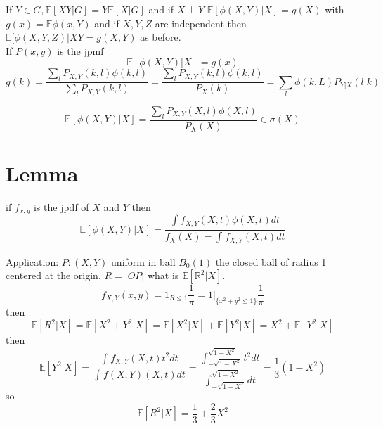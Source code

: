 \documentclass[11pt]{article}
\begin{document}
If $Y \in G, \mathbb{E}[XY | G] = Y \mathbb{E}[X | G]$ and
if $X \perp Y$  $ \mathbb{E}[\phi(X,Y) | X] = g(X)$  with $g(x) = \mathbb{E} \phi(x,Y)$ and if
$X,Y,Z$ are independent then  $ \mathbb{E}[\phi(X,Y,Z) | XY = g(X,Y)$ as before.\\
If $P(x,y)$ is the jpmf
 \[
     \mathbb{E}[\phi(X,Y) | X] = g(x)
\] 
\[
g(k) = \frac{\sum_{l}^{}P_{X,Y}(k,l)\phi(k,l)}{\sum_{l}^{}P_{X,Y}(k,l)} = \frac{\sum_{l}^{} P_{X,Y}(k,l)\phi(k,l)}{P_X(k)} = \sum_{l}^{}\phi(k,L) P_{Y|X}(l | k)
\] 

\[
    \mathbb{E}[\phi(X,Y) | X] = \frac{\sum_{l}^{}P_{X,Y}(X,l)\phi(X,l)}{P_X(X)} \in \sigma(X)
\] 

\section{Lemma}
if $f_{x,y}$ is the jpdf of  $X$ and $Y$ then
 \[
     \mathbb{E}[\phi(X,Y) | X] = \frac{\int_{}^{}f_{X,Y}(X,t)\phi(X,t)dt}{f_X(X) = \int_{}^{}f_{X,Y}(X,t)dt}
\] 

Application: $P : (X,Y)$ uniform in ball $B_0(1)$ the closed ball of radius 1 centered at the origin.
$R = |OP|$ what is  $ \mathbb{E}[ \mathbb{R}^2 | X]$.
\[
    f_{X,Y}(x,y) = 1_{R \le 1} \frac{1}{\pi} = 1|_{\{x^2 + y^2 \le 1\}} \frac{1}{\pi}
\] 
then
\[
    \mathbb{E}[ R^2 | X] =  \mathbb{E}[ X^2 + Y^2 | X ] = \mathbb{E}[X^2 | X] + \mathbb{E}[Y^2 | X] = X^2 + \mathbb{E}[Y^2 | X]
\]  
then
\[
    \mathbb{E}[Y^2 | X] =  \frac{\int_{}^{}f_{X,Y}(X,t)t^2 dt}{ \int_{}^{}f(X,Y)(X,t)dt} = \frac{\int_{-\sqrt{1- X^2}}^{\sqrt{1 - X^2}}t^2 dt}{ \int_{-\sqrt{1-X^2}}^{\sqrt{1-X^2}}dt} = \frac{1}{3}(1-X^2)
\] 
so
\[
    \mathbb{E}[R^2| X] = \frac{1}{3} + \frac{2}{3}X^2
\] 
\end{document}
